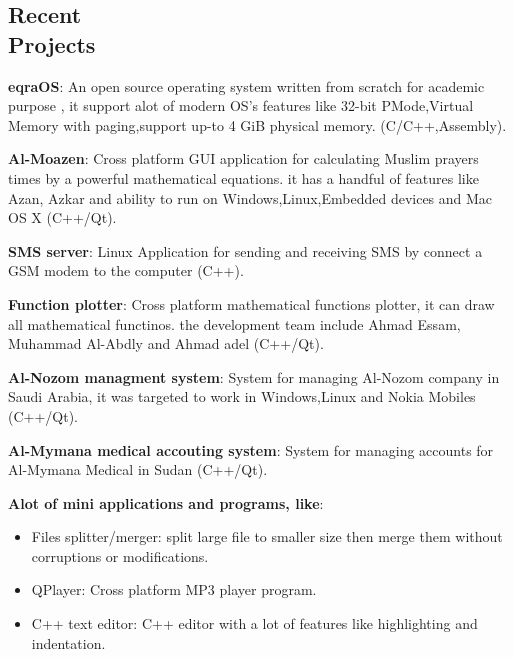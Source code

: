 \documentclass[margin,line]{resume}
\begin{document}
\begin{resume}
    \section{\mysidestyle Recent\\ Projects}

\textbf{eqraOS}: An open source operating system written from scratch for academic purpose , it support alot of modern OS's features like 32-bit PMode,Virtual Memory with paging,support up-to 4 GiB physical memory. (C/C++,Assembly).

\vspace{-2mm}

\textbf{Al-Moazen}: Cross platform GUI application for calculating Muslim prayers times by a powerful mathematical equations. it has a handful of features like Azan, Azkar and ability to run on Windows,Linux,Embedded devices and Mac OS X (C++/Qt).

\vspace{-2mm}


\textbf{SMS server}: Linux Application for sending and receiving SMS by connect a GSM modem to the computer (C++).

\vspace{-2mm}

\textbf{Function plotter}: Cross platform mathematical functions plotter, it can draw all mathematical functinos. the development team include Ahmad Essam, Muhammad Al-Abdly and Ahmad adel (C++/Qt).

\vspace{-2mm}

\textbf{Al-Nozom managment system}: System for managing Al-Nozom company in Saudi Arabia, it was targeted to work in Windows,Linux and Nokia Mobiles (C++/Qt).

\vspace{-2mm}

\textbf{Al-Mymana medical accouting system}: System for managing accounts for Al-Mymana Medical in Sudan (C++/Qt).

\vspace{-2mm}

\textbf{Alot of mini applications and programs, like}:
\begin{itemize}
\item Files splitter/merger: split large file to smaller size then merge them without corruptions or modifications.
\item QPlayer: Cross platform MP3 player program.
\item C++ text editor: C++ editor with a lot of features like highlighting and indentation.
\end{itemize}



\end{resume}
\end{document}
